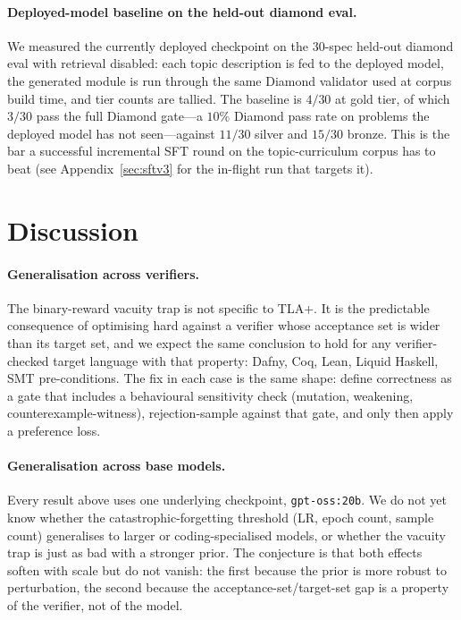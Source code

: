 \documentclass[11pt]{article}
\begin{document}
\paragraph{Deployed-model baseline on the held-out diamond eval.} We
measured the currently deployed checkpoint on the $30$-spec held-out
diamond eval with retrieval disabled: each topic description is fed to
the deployed model, the generated module is run through the same
Diamond validator used at corpus build time, and tier counts are
tallied. The baseline is $4/30$ at gold tier, of which $3/30$ pass the
full Diamond gate---a $10\%$ Diamond pass rate on problems the
deployed model has not seen---against $11/30$ silver and $15/30$
bronze. This is the bar a successful incremental SFT round on the
topic-curriculum corpus has to beat
(see Appendix~\ref{sec:sftv3} for the in-flight run that targets it).

\section{Discussion}
\label{sec:discussion}

\paragraph{Generalisation across verifiers.} The binary-reward vacuity
trap is not specific to TLA+. It is the predictable consequence of
optimising hard against a verifier whose acceptance set is wider than
its target set, and we expect the same conclusion to hold for any
verifier-checked target language with that property: Dafny, Coq, Lean,
Liquid Haskell, SMT pre-conditions. The fix in each case is the same
shape: define correctness as a gate that includes a behavioural
sensitivity check (mutation, weakening, counterexample-witness),
rejection-sample against that gate, and only then apply a preference
loss.

\paragraph{Generalisation across base models.} Every result above uses
one underlying checkpoint, \texttt{gpt-oss:20b}. We do not yet know
whether the catastrophic-forgetting threshold (LR, epoch count, sample
count) generalises to larger or coding-specialised models, or whether
the vacuity trap is just as bad with a stronger prior. The conjecture
is that both effects soften with scale but do not vanish: the first
because the prior is more robust to perturbation, the second because
the acceptance-set/target-set gap is a property of the verifier, not
of the model.
\end{document}
